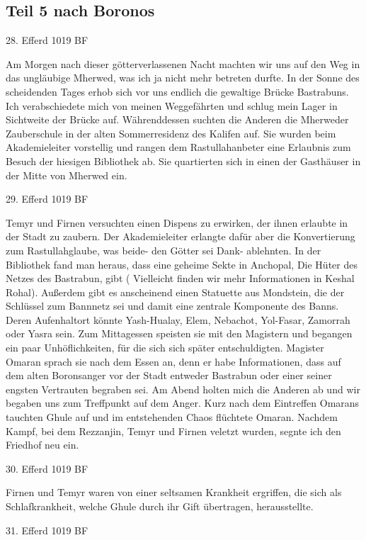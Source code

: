 \subsection{Teil 5 nach Boronos}

28. Efferd 1019 BF

Am Morgen nach dieser götterverlassenen Nacht machten wir uns auf den Weg in das ungläubige Mherwed, was ich ja nicht mehr betreten durfte.
In der Sonne des scheidenden Tages erhob sich vor uns endlich die gewaltige Brücke Bastrabuns. Ich verabschiedete mich von meinen Weggefährten und schlug mein Lager in Sichtweite der Brücke auf. Währenddessen suchten die Anderen die Mherweder Zauberschule in der alten Sommerresidenz des Kalifen auf. Sie wurden beim Akademieleiter vorstellig und rangen dem Rastullahanbeter eine Erlaubnis zum Besuch der hiesigen Bibliothek ab. Sie quartierten sich in einen der Gasthäuser in der Mitte von Mherwed ein.

29. Efferd 1019 BF

Temyr und Firnen versuchten einen Dispens zu erwirken, der ihnen erlaubte in der Stadt zu zaubern. Der Akademieleiter erlangte dafür aber die Konvertierung zum Rastullahglaube, was beide- den Götter sei Dank- ablehnten. In der Bibliothek fand man heraus, dass eine geheime Sekte in Anchopal, Die Hüter des Netzes des Bastrabun, gibt ( Vielleicht finden wir mehr Informationen in Keshal Rohal). Außerdem gibt es anscheinend einen Statuette aus Mondstein, die der Schlüssel zum Bannnetz sei und damit eine zentrale Komponente des Banns. Deren Aufenhaltort könnte Yash-Hualay, Elem, Nebachot, Yol-Fasar, Zamorrah oder Yasra sein.
Zum Mittagessen speisten sie mit den Magistern und begangen ein paar Unhöflichkeiten, für die sich sich später entschuldigten.
Magister Omaran sprach sie nach dem Essen an, denn er habe Informationen, dass auf dem alten Boronsanger vor der Stadt entweder Bastrabun oder einer seiner engsten Vertrauten begraben sei.
Am Abend holten mich die Anderen ab und wir begaben uns zum Treffpunkt auf dem Anger. Kurz nach dem Eintreffen Omarans tauchten Ghule auf und im entstehenden Chaos flüchtete Omaran. Nachdem Kampf, bei dem Rezzanjin, Temyr und Firnen veletzt wurden, segnte ich den Friedhof neu ein.

30. Efferd 1019 BF

Firnen und Temyr waren von einer seltsamen Krankheit ergriffen, die sich als Schlafkrankheit, welche Ghule durch ihr Gift übertragen, herausstellte.

31. Efferd 1019 BF

